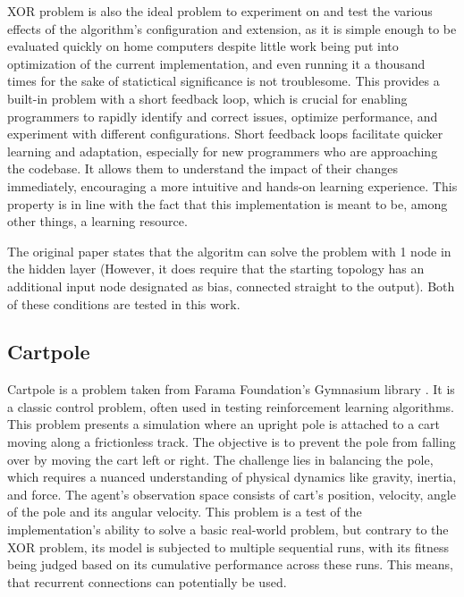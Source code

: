 \documentclass{article}
\begin{document}
        XOR problem is also the ideal problem to experiment on and test the various effects of the algorithm's configuration and extension,
        as it is simple enough to be evaluated quickly on home computers despite little work being put into optimization of the
        current implementation,
        and even running it a thousand times for the sake of statictical significance is not troublesome.
        This provides a built-in problem with a short feedback loop, which is crucial for 
        enabling programmers to rapidly identify and correct issues, optimize performance, and experiment with different configurations.
        Short feedback loops facilitate quicker learning and adaptation, especially for new programmers who are approaching the codebase.
        It allows them to understand the impact of their changes immediately, encouraging a more intuitive and hands-on learning experience.
        This property is in line with the fact that this implementation is meant to be, among other things, a learning resource.

        The original paper \cite{originalNeat}
        states that the algoritm can solve the problem with 1 node in the hidden layer (However,
        it does require that the starting topology has an additional input node designated
        as bias, connected straight to the output). Both of these conditions are tested in this work.

        \subsection{Cartpole}
        Cartpole is a problem taken from Farama Foundation's Gymnasium library \cite{gymnasium}. It is a classic control problem,
        often used in testing reinforcement learning algorithms.
        This problem presents a simulation where an upright pole is attached to a cart moving along a frictionless track.
        The objective is to prevent the pole from falling over by moving the cart left or right.
        The challenge lies in balancing the pole,
        which requires a nuanced understanding of physical dynamics like gravity, inertia, and force.
        The agent's observation space consists of cart's 
        position, velocity, angle of the pole and its angular velocity.
        This problem is a test of the implementation's ability to solve a basic real-world problem, but contrary 
        to the XOR problem, its model is subjected to multiple sequential runs,
        with its fitness being judged based on its cumulative performance across these runs. This means, that
        recurrent connections can potentially be used.
\end{document}
